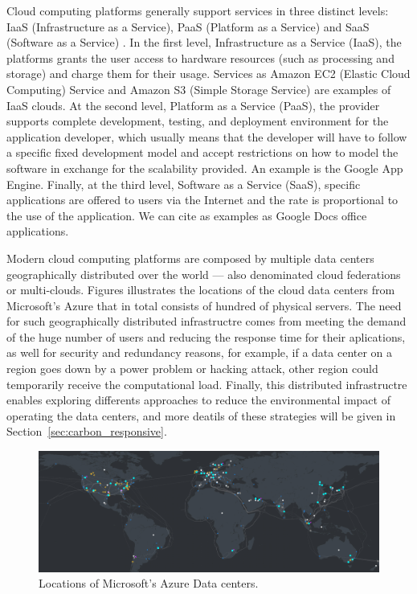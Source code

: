 Cloud computing platforms generally support services in three distinct levels: IaaS (Infrastructure as a Service), PaaS (Platform as a Service) and SaaS (Software as a Service) \citep{fos08}. In the first level, Infrastructure as a Service (IaaS), the platforms grants the user access to hardware resources (such as processing and storage) and charge them for their usage. Services as Amazon EC2 (Elastic Cloud Computing) Service and Amazon S3 (Simple Storage Service) are examples of IaaS clouds.   At the second level, Platform as a Service (PaaS), the provider supports complete development, testing, and deployment environment for the application developer, which usually means that the developer will have to follow a specific fixed development model and accept restrictions on how to model the software in exchange for the scalability provided. An example is the Google App Engine.  Finally, at the third level, Software as a Service (SaaS), specific applications are offered to users via the Internet and the rate is proportional to the use of the application. We can cite as examples as Google Docs office applications.

Modern cloud computing platforms are composed by multiple data centers geographically distributed over the world --- also denominated cloud federations or multi-clouds. Figures illustrates the locations of the cloud data centers from Microsoft's Azure that in total consists of hundred of physical servers. The need for such geographically distributed infrastructre comes from meeting the demand of the huge number of users and reducing the response time for their aplications, as well for security and redundancy reasons, for example, if a data center on a region goes down by a power problem or hacking attack, other region could temporarily receive the computational load. Finally, this distributed infrastructre enables exploring differents approaches to reduce the environmental impact of operating the data centers, and more deatils of these strategies will be given in Section~\ref{sec:carbon_responsive}.


\begin{figure}[h]
\centering
  \includegraphics[width=\linewidth]{images/azure_cloud_infra.png}
  \caption{Locations of Microsoft's Azure Data centers.}
  \label{fig:dc_locations}
\end{figure}


